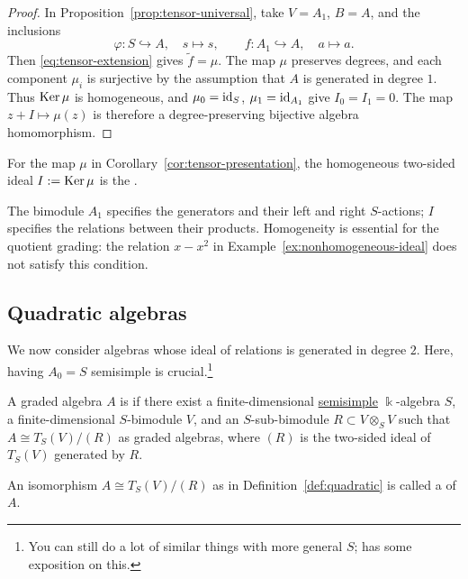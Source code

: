 \begin{supplementary}
\begin{proof}
In Proposition~\ref{prop:tensor-universal}, take $V=A_1$, $B=A$, and the inclusions
\[
\varphi:S\hookrightarrow A,\quad s\longmapsto s,
\qquad f:A_1\hookrightarrow A,\quad a\longmapsto a.
\]
Then \eqref{eq:tensor-extension} gives $\widetilde f=\mu$.
The map $\mu$ preserves degrees, and each component $\mu_i$ is surjective by the assumption that $A$ is generated in degree $1$.
Thus $\operatorname{Ker}\nolimits\mu$ is homogeneous, and $\mu_0=\operatorname{id}_S$, $\mu_1=\operatorname{id}_{A_1}$ give $I_0=I_1=0$.
The map $z+I\mapsto\mu(z)$ is therefore a degree-preserving bijective algebra homomorphism.
\end{proof}
\end{supplementary}

\begin{definition}\label{def:relations}
For the map $\mu$ in Corollary~\ref{cor:tensor-presentation}, the homogeneous two-sided ideal $I:=\operatorname{Ker}\nolimits\mu$ is the .
\end{definition}

The bimodule $A_1$ specifies the generators and their left and right $S$-actions; $I$ specifies the relations between their products.
Homogeneity is essential for the quotient grading: the relation $x-x^2$ in Example~\ref{ex:nonhomogeneous-ideal} does not satisfy this condition.

\subsection{Quadratic algebras}

We now consider algebras whose ideal of relations is generated in degree $2$.  Here, having $A_0=S$ semisimple is crucial.\footnote{You can still do a lot of similar things with more general $S$;  \cite{PP05} has some exposition on this.}

\begin{definition}\label{def:quadratic} 
A graded algebra $A$ is  if there exist a finite-dimensional \underline{semisimple} $\Bbbk$-algebra $S$, a finite-dimensional $S$-bimodule $V$, and an $S$-sub-bimodule $R\subset V\otimes_S V$ such that $A\cong T_S(V)/(R)$ as graded algebras, where $(R)$ is the two-sided ideal of $T_S(V)$ generated by $R$.
\end{definition}

An isomorphism $A\cong T_S(V)/(R)$ as in Definition~\ref{def:quadratic} is called a  of $A$.


